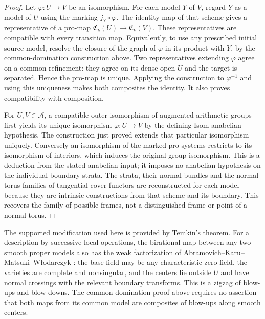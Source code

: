 \begin{proof}
Let $\varphi:U\to V$ be an isomorphism. For each model $Y$ of $V$,
regard $Y$ as a model of $U$ using the marking $j_Y\circ\varphi$.
The identity map of that scheme gives a representative of a pro-map
$\mathfrak C_k(U)\to\mathfrak C_k(V)$. These representatives are
compatible with every transition map. Equivalently, to use any prescribed
initial source model, resolve the closure of the graph of $\varphi$ in
its product with $Y$, by the common-domination construction above.
Two representatives extending $\varphi$ agree on a common refinement:
they agree on its dense open $U$ and the target is separated. Hence the
pro-map is unique. Applying the construction to $\varphi^{-1}$ and using
this uniqueness makes both composites the identity. It also proves
compatibility with composition.

For $U,V\in\mathcal A$, a compatible outer isomorphism of augmented
arithmetic groups first yields its unique isomorphism $\varphi:U\to V$
by the defining Isom-anabelian hypothesis. The construction just proved
extends that particular isomorphism uniquely. Conversely an isomorphism
of the marked pro-systems restricts to its isomorphism of interiors,
which induces the original group isomorphism. This is a deduction from
the stated anabelian input; it imposes no anabelian hypothesis on the
individual boundary strata. The strata, their normal bundles and the
normal-torus families of tangential cover functors are reconstructed
for each model because they are intrinsic constructions from that
scheme and its boundary. This recovers the family of possible frames,
not a distinguished frame or point of a normal torus.
\end{proof}

The supported modification used here is provided by Temkin's theorem.
For a description by successive local operations, the birational map
between any two smooth proper models also has the weak factorization
of Abramovich--Karu--Matsuki--W{\l}odarczyk
\cite[Theorem~0.3.1, especially~(6), pp.~2--3]{AKMW2002A567}:
the base field may be any characteristic-zero field, the varieties are
complete and nonsingular, and the centers lie outside $U$ and have
normal crossings with the relevant boundary transforms. This is a
zigzag of blow-ups and blow-downs. The common-domination proof above
requires no assertion that both maps from its common model are
composites of blow-ups along smooth centers.

